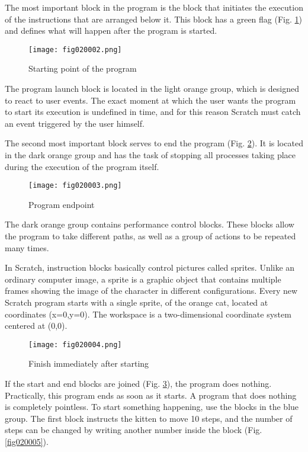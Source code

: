 The most important block in the program is the block that initiates the execution of the instructions that are arranged below it. This block has a green flag (Fig. \ref{fig020002}) and defines what will happen after the program is started.

\begin{figure}[H]
   \centering
   \texttt{[image: fig020002.png]}
   \caption{Starting point of the program}
\label{fig020002}
\end{figure}

The program launch block is located in the light orange group, which is designed to react to user events. The exact moment at which the user wants the program to start its execution is undefined in time, and for this reason Scratch must catch an event triggered by the user himself.

The second most important block serves to end the program (Fig. \ref{fig020003}). It is located in the dark orange group and has the task of stopping all processes taking place during the execution of the program itself.

\begin{figure}[H]
   \centering
   \texttt{[image: fig020003.png]}
   \caption{Program endpoint}
\label{fig020003}
\end{figure}

The dark orange group contains performance control blocks. These blocks allow the program to take different paths, as well as a group of actions to be repeated many times.

In Scratch, instruction blocks basically control pictures called sprites. Unlike an ordinary computer image, a sprite is a graphic object that contains multiple frames showing the image of the character in different configurations. Every new Scratch program starts with a single sprite, of the orange cat, located at coordinates (x=0,y=0). The workspace is a two-dimensional coordinate system centered at (0,0).

\begin{figure}[H]
   \centering
   \texttt{[image: fig020004.png]}
   \caption{Finish immediately after starting}
\label{fig020004}
\end{figure}

If the start and end blocks are joined (Fig. \ref{fig020004}), the program does nothing. Practically, this program ends as soon as it starts. A program that does nothing is completely pointless. To start something happening, use the blocks in the blue group. The first block instructs the kitten to move 10 steps, and the number of steps can be changed by writing another number inside the block (Fig. \ref{fig020005}).

